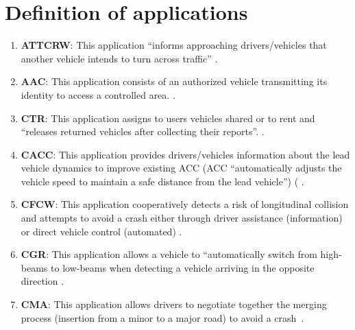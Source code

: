 \section{Definition of applications}\label{appendix:app}
\begin{enumerate}
\item \textbf{\acrfull{ATTCRW}}: This application ``informs approaching drivers/vehicles that another vehicle intends to turn across traffic'' \cite{etsi_etsi_tr_102_638_intelligent_2009,j_vehicle--vehicle_2014,al-sultan_comprehensive_2014,miucic_v2x_2018,cailean_survey_2014,xu_dsrc_2017,zeadally_tutorial_2020,noauthor_intelligent_nodate}.
\item \textbf{\acrfull{AAC}}: This application consists of an authorized vehicle transmitting its identity to access a controlled area. \cite{etsi_etsi_tr_102_638_intelligent_2009}.
\item \textbf{\acrfull{CTR}}: This application assigns to users vehicles shared or to rent and ``releases returned vehicles after collecting their reports''. \cite{etsi_etsi_tr_102_638_intelligent_2009,3gpp_tr_22886_3rd_2018}.
\item \textbf{\acrfull{CACC}}: This application provides drivers/vehicles information about the lead vehicle dynamics to improve existing \acrfull{ACC} (\acrshort{ACC} ``automatically adjusts the vehicle speed to maintain a safe distance from the lead vehicle'') ( \cite{etsi_etsi_tr_102_638_intelligent_2009,papadimitratos_vehicular_2009,brown_review_2019,zeadally_tutorial_2020,zeng_potential_2012,chang_estimated_2015,noauthor_intelligent_nodate}.
\item \textbf{\acrfull{CFCW}}: This application cooperatively detects a risk of longitudinal collision and attempts to avoid a crash either through driver assistance (information) or direct vehicle control (automated) \cite{etsi_etsi_tr_102_638_intelligent_2009,papadimitratos_vehicular_2009,brown_review_2019,boban_use_2017,3gpp_tr_22886_3rd_2018,raza_social_2018,karagiannis_vehicular_2011,chang_intelligent_2010,cailean_survey_2014, xu_dsrc_2017,bila_vehicles_2017,noauthor_5g_2015,gupta_medium_2015,dey_vehicle--vehicle_2016,xiang_research_2014,ye_v2v_2008,noauthor_intelligent_nodate}.
\item \textbf{\acrfull{CGR}}: This application allows a vehicle to ``automatically switch from high-beams to low-beams when detecting a vehicle arriving in the opposite direction \cite{etsi_etsi_tr_102_638_intelligent_2009,brown_review_2019}.
\item \textbf{\acrfull{CMA}}: This application allows drivers to negotiate together the merging process (insertion from a minor to a major road) to avoid a crash~\cite{etsi_etsi_tr_102_638_intelligent_2009,papadimitratos_vehicular_2009,j_vehicle--vehicle_2014,al-sultan_comprehensive_2014,karagiannis_vehicular_2011}.

\end{enumerate}
